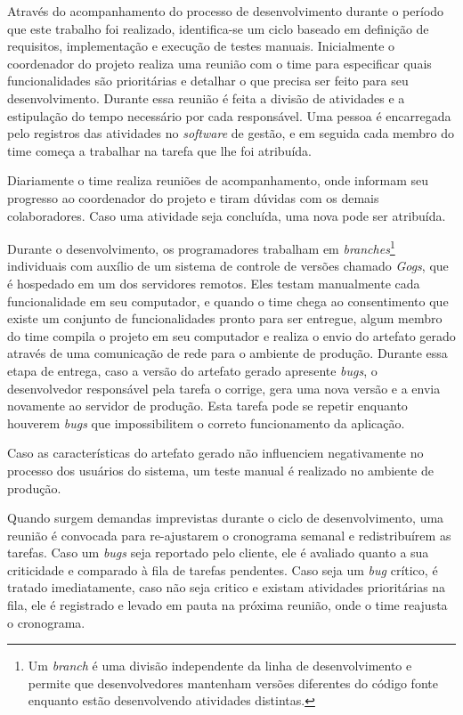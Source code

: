 \documentclass[
12pt,				%
openright,			%
oneside,			%
a4paper,			%
english,			%
french,				%
spanish,			%
brazil,				%
]{abntex2}
\begin{document}
Através do acompanhamento do processo de desenvolvimento durante o período que este trabalho foi realizado, identifica-se um ciclo baseado em definição de requisitos, implementação e execução de testes manuais. Inicialmente o coordenador do projeto realiza uma reunião com o time para especificar quais funcionalidades são prioritárias e detalhar o que precisa ser feito para seu desenvolvimento. Durante essa reunião é feita a divisão de atividades e a estipulação do tempo necessário por cada responsável. Uma pessoa é encarregada pelo registros das atividades no \textit{software} de gestão, e em seguida cada membro do time começa a trabalhar na tarefa que lhe foi atribuída.

Diariamente o time realiza reuniões de acompanhamento, onde informam seu progresso ao coordenador do projeto e tiram dúvidas com os demais colaboradores. Caso uma atividade seja concluída, uma nova pode ser atribuída.

Durante o desenvolvimento, os programadores trabalham em \textit{branches}\footnote{Um \textit{branch} é uma divisão independente da linha de desenvolvimento e permite que desenvolvedores mantenham versões diferentes do código fonte enquanto estão desenvolvendo atividades distintas.} individuais com auxílio de um sistema de controle de versões chamado \textit{Gogs}, que é hospedado em um dos servidores remotos. Eles testam manualmente cada funcionalidade em seu computador, e quando o time chega ao consentimento que existe um conjunto de funcionalidades pronto para ser entregue, algum membro do time compila o projeto em seu computador e realiza o envio do artefato gerado através de uma comunicação de rede para o ambiente de produção. Durante essa etapa de entrega, caso a versão do artefato gerado apresente \textit{bugs}, o desenvolvedor responsável pela tarefa o corrige, gera uma nova versão e a envia novamente ao servidor de produção. Esta tarefa pode se repetir enquanto houverem \textit{bugs} que impossibilitem o correto funcionamento da aplicação.

Caso as características do artefato gerado não influenciem negativamente no processo dos usuários do sistema, um teste manual é realizado no ambiente de produção.

Quando surgem demandas imprevistas durante o ciclo de desenvolvimento, uma reunião é convocada para re-ajustarem o cronograma semanal e redistribuírem as tarefas. Caso um \textit{bugs} seja reportado pelo cliente, ele é avaliado quanto a sua criticidade e comparado à fila de tarefas pendentes. Caso seja um \textit{bug} crítico, é tratado imediatamente, caso não seja critico e existam atividades prioritárias na fila, ele é registrado e levado em pauta na próxima reunião, onde o time reajusta o cronograma.
\end{document}
